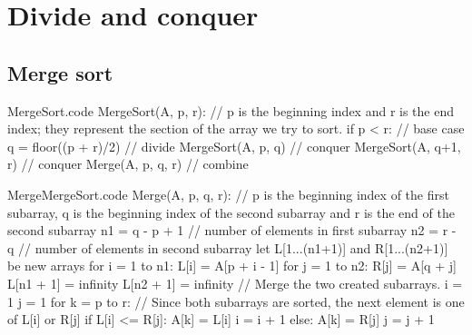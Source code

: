\documentclass[a4paper]{article}
\begin{document}
\section{Divide and conquer}
\subsection{Merge sort}

\begin{filecontents*}[overwrite]{MergeSort.code}
MergeSort(A, p, r):
    // p is the beginning index and r is the end index; they represent the section of the array we try to sort.
    if p < r:  // base case
        q = floor((p + r)/2)  // divide
        MergeSort(A, p, q)  // conquer
        MergeSort(A, q+1, r)  // conquer
        Merge(A, p, q, r)  // combine
\end{filecontents*}

\begin{filecontents*}[overwrite]{MergeMergeSort.code}
Merge(A, p, q, r):
    // p is the beginning index of the first subarray, q is the beginning index of the second subarray and r is the end of the second subarray
    n1 = q - p + 1 // number of elements in first subarray
    n2 = r - q  // number of elements in second subarray
    let L[1...(n1+1)] and R[1...(n2+1)] be new arrays
    for i = 1 to n1:
        L[i] = A[p + i - 1]
    for j = 1 to n2:
        R[j] = A[q + j]
    L[n1 + 1] = infinity
    L[n2 + 1] = infinity
    // Merge the two created subarrays.
    i = 1
    j = 1
    for k = p to r:
        // Since both subarrays are sorted, the next element is one of L[i] or R[j]
        if L[i] <= R[j]:
            A[k] = L[i]
            i = i + 1
        else:
            A[k] = R[j]
            j = j + 1
\end{filecontents*}
\end{document}
